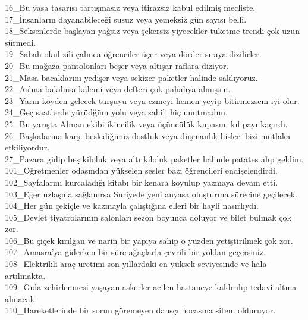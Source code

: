 16\_Bu yasa tasarısı tartışmasız veya itirazsız kabul edilmiş mecliste. \\
17\_İnsanların dayanabileceği susuz veya yemeksiz gün sayısı belli. \\
18\_Seksenlerde başlayan yağsız veya şekersiz yiyecekler tüketme trendi çok uzun sürmedi. \\
19\_Sabah okul zili çalınca öğrenciler üçer veya dörder sıraya dizilirler. \\
20\_Bu mağaza pantolonları beşer veya altışar raflara diziyor. \\
21\_Masa bacaklarını yedişer veya sekizer paketler halinde saklıyoruz. \\
22\_Aslına bakılırsa kalemi veya defteri çok pahalıya almışsın. \\
23\_Yarın köyden gelecek turşuyu veya ezmeyi hemen yeyip bitirmezsem iyi olur. \\
24\_Geç saatlerde yürüdğüm yolu veya sahili hiç unutmadım. \\
25\_Bu yarışta Alman ekibi ikincilik veya üçüncülük kupasını kıl payı kaçırdı. \\
26\_Başkalarına karşı beslediğimiz dostluk veya düşmanlık hisleri bizi mutlaka etkiliyordur. \\
27\_Pazara gidip beş kiloluk veya altı kiloluk paketler halinde patates alıp geldim. \\
101\_Öğretmenler odasından yükselen sesler bazı öğrencileri endişelendirdi.\\
102\_Sayfalarını kurcaladığı kitabı bir kenara koyulup yazmaya devam etti.\\
103\_Eğer uzlaşma sağlanırsa Suriyede yeni anyasa oluşturma sürecine geçilecek.\\
104\_Her gün çekiçle ve kazmayla çalıştığına elleri bir hayli nasırlıydı.\\
105\_Devlet tiyatrolarının salonları sezon boyunca doluyor ve bilet bulmak çok zor.\\
106\_Bu çiçek kırılgan ve narin bir yapıya sahip o yüzden yetiştirilmek çok zor.\\
107\_Amasra'ya giderken bir süre ağaçlarla çevrili bir yoldan geçersiniz.\\
108\_Elektrikli araç üretimi son yıllardaki en yüksek seviyesinde ve hala artılmakta.\\
109\_Gıda zehirlenmesi yaşayan askerler acilen hastaneye kaldırılıp tedavi altına alınacak.\\
110\_Hareketlerinde bir sorun göremeyen dansçı hocasına sitem olduruyor.\\
